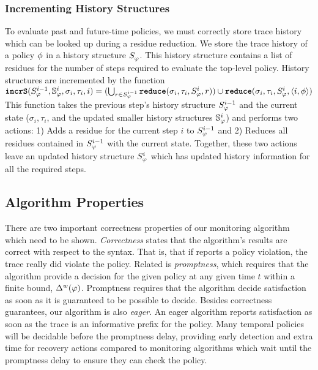 \subsubsection{Incrementing History Structures}
To evaluate past and future-time policies, we must correctly store trace history which can be looked up during a residue reduction. 
We store the trace history of a policy $\policyv$ in a history structure $\histst[\policyv]{}$. 
This history structure contains a list of residues for the number of steps required to evaluate the top-level policy. History structures are incremented by the function 
$\incrS(\histst[\policyv]{i-1}, \histSt[\policyv]{i}, \sigma_i, \tau_i, i) = (\bigcup_{r \in \histst[\policyv]{i-1}} \reduce(\sigma_i, \tau_i, \histst[\policyv]{i}, r)) \cup \reduce(\sigma_i, \tau_i, \histst[\policyv]{i}, \rp{i}{\policyv})$
%
This function takes the previous step's history structure $\histst[\policyv]{i-1}$ and the current state ($\sigma_i,\tau_i$, and the updated smaller history structures $\histSt[policyv]{i}$) and performs two actions:
	1) Adds a residue for the current step $i$ to $\histst[policyv]{i-1}$ and
	2) Reduces all residues contained in $\histst[policyv]{i-1}$ with the current state.
Together, these two actions leave an updated history structure $\histst[policyv]{i}$ which has updated history information for all the required steps.

\subsection{Algorithm Properties}
There are two important correctness properties of our monitoring algorithm which need to be shown. \emph{Correctness} states that the algorithm's results are correct with respect to the syntax. That is, that if \monitor reports a policy violation, the trace really did violate the policy. Related is \emph{promptness}, which requires that the algorithm provide a decision for the given policy at any given time $t$ within a finite bound, $\wdelay(\policy)$. Promptness requires that the algorithm decide satisfaction as soon as it is guaranteed to be possible to decide. 
%
Besides correctness guarantees, our algorithm is also \emph{eager}. An eager algorithm reports satisfaction as soon as the trace is an informative prefix \cite{Kupferman2001} for the policy. Many temporal policies will be decidable before the promptness delay, providing early detection and extra time for recovery actions compared to monitoring algorithms which wait until the promptness delay to ensure they can check the policy. 

